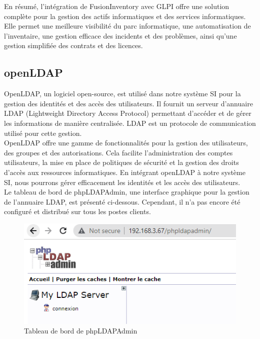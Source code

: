 En résumé, l'intégration de FusionInventory avec GLPI offre une solution complète pour la gestion des actifs informatiques et des services informatiques. Elle permet une meilleure visibilité du parc informatique, une automatisation de l'inventaire, une gestion efficace des incidents et des problèmes, ainsi qu'une gestion simplifiée des contrats et des licences. \\

\subsection{openLDAP}

OpenLDAP, un logiciel open-source, est utilisé dans notre système SI pour la gestion des identités et des accès des utilisateurs. Il fournit un serveur d'annuaire LDAP (Lightweight Directory Access Protocol) permettant d'accéder et de gérer les informations de manière centralisée. LDAP est un protocole de communication utilisé pour cette gestion. \\

OpenLDAP offre une gamme de fonctionnalités pour la gestion des utilisateurs, des groupes et des autorisations. Cela facilite l'administration des comptes utilisateurs, la mise en place de politiques de sécurité et la gestion des droits d'accès aux ressources informatiques. En intégrant openLDAP à notre système SI, nous pourrons gérer efficacement les identités et les accès des utilisateurs. \\

Le tableau de bord de phpLDAPAdmin, une interface graphique pour la gestion de l'annuaire LDAP, est présenté ci-dessous. Cependant, il n'a pas encore été configuré et distribué sur tous les postes clients. \\

\begin{figure}[H]
\centering
\includegraphics[width=15cm]{Images/ldapdashboard.png}
\caption{Tableau de bord de phpLDAPAdmin}
\label{fig:ldap-dashboard}
\end{figure}

